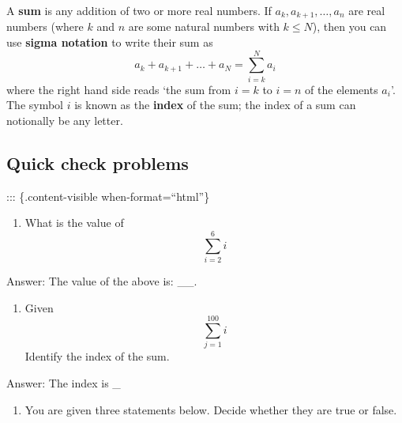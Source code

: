 \documentclass[
  12pt,
  a4paper, oneside]{starmastarticle}
\providecommand{\tightlist}{%
  \setlength{\itemsep}{0pt}\setlength{\parskip}{0pt}}\usepackage{longtable,booktabs,array}
\begin{document}
\begin{tcolorbox}[enhanced jigsaw, arc=.35mm, colframe=quarto-callout-note-color-frame, rightrule=.15mm, bottomrule=.15mm, toprule=.15mm, leftrule=.75mm, left=2mm, opacityback=0, colback=white, breakable]
\begin{minipage}[t]{5.5mm}
\textcolor{quarto-callout-note-color}{\faInfo}
\end{minipage}%
\begin{minipage}[t]{\textwidth - 5.5mm}
A \textbf{sum} is any addition of two or more real numbers. If
\(a_k,a_{k+1}, \ldots, a_n\) are real numbers (where \(k\) and \(n\) are
some natural numbers with \(k\leq N\)), then you can use \textbf{sigma
notation} to write their sum as
\[a_k + a_{k+1} + \ldots + a_N = \sum_{i = k}^N a_i\] where the right
hand side reads `the sum from \(i = k\) to \(i = n\) of the elements
\(a_i\)'. The symbol \(i\) is known as the \textbf{index} of the sum;
the index of a sum can notionally be any letter.\end{minipage}%
\end{tcolorbox}

\hypertarget{quick-check-problems}{%
\subsection*{Quick check problems}\label{quick-check-problems}}

::: \{.content-visible when-format=``html''\}

\begin{enumerate}
\def\labelenumi{\arabic{enumi}.}
\tightlist
\item
  What is the value of \[\sum_{i = 2}^{6} i\]
\end{enumerate}

Answer: The value of the above is: \_\_.

\begin{enumerate}
\def\labelenumi{\arabic{enumi}.}
\setcounter{enumi}{1}
\tightlist
\item
  Given \[\sum_{j = 1}^{100} i\] Identify the index of the sum.
\end{enumerate}

Answer: The index is \_

\begin{enumerate}
\def\labelenumi{\arabic{enumi}.}
\setcounter{enumi}{2}
\tightlist
\item
  You are given three statements below. Decide whether they are true or
  false.
\end{enumerate}
\end{document}
